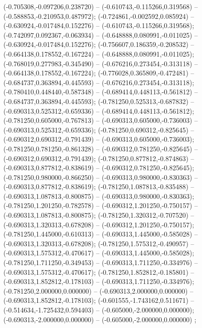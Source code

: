  (-0.705308,-0.097206,0.238720) -- (-0.610743,-0.115266,0.319568) -- (-0.588853,-0.210953,0.487972);
 (-0.724861,-0.002592,0.085924) -- (-0.630924,-0.017484,0.152276) -- (-0.610743,-0.115266,0.319568);
 (-0.742097,0.092367,-0.063934) -- (-0.648888,0.080991,-0.011025) -- (-0.630924,-0.017484,0.152276);
 (-0.756607,0.186359,-0.208532) -- (-0.664138,0.178552,-0.167224) -- (-0.648888,0.080991,-0.011025);
 (-0.768019,0.277983,-0.345490) -- (-0.676216,0.273454,-0.313118) -- (-0.664138,0.178552,-0.167224);
 (-0.776028,0.365809,-0.472481) -- (-0.684737,0.363894,-0.445593) -- (-0.676216,0.273454,-0.313118);
 (-0.780410,0.448440,-0.587348) -- (-0.689414,0.448113,-0.561812) -- (-0.684737,0.363894,-0.445593);
 (-0.781250,0.525313,-0.687832) -- (-0.690313,0.525312,-0.659336) -- (-0.689414,0.448113,-0.561812);
 (-0.781250,0.605000,-0.767813) -- (-0.690313,0.605000,-0.736003) -- (-0.690313,0.525312,-0.659336);
 (-0.781250,0.690312,-0.825645) -- (-0.690312,0.690312,-0.791439) -- (-0.690313,0.605000,-0.736003);
 (-0.781250,0.781250,-0.861328) -- (-0.690312,0.781250,-0.825645) -- (-0.690312,0.690312,-0.791439);
 (-0.781250,0.877812,-0.874863) -- (-0.690313,0.877812,-0.838619) -- (-0.690312,0.781250,-0.825645);
 (-0.781250,0.980000,-0.866250) -- (-0.690313,0.980000,-0.830363) -- (-0.690313,0.877812,-0.838619);
 (-0.781250,1.087813,-0.835488) -- (-0.690313,1.087813,-0.800875) -- (-0.690313,0.980000,-0.830363);
 (-0.781250,1.201250,-0.782578) -- (-0.690312,1.201250,-0.750157) -- (-0.690313,1.087813,-0.800875);
 (-0.781250,1.320312,-0.707520) -- (-0.690313,1.320313,-0.678208) -- (-0.690312,1.201250,-0.750157);
 (-0.781250,1.445000,-0.610313) -- (-0.690313,1.445000,-0.585028) -- (-0.690313,1.320313,-0.678208);
 (-0.781250,1.575312,-0.490957) -- (-0.690313,1.575312,-0.470617) -- (-0.690313,1.445000,-0.585028);
 (-0.781250,1.711250,-0.349453) -- (-0.690313,1.711250,-0.334976) -- (-0.690313,1.575312,-0.470617);
 (-0.781250,1.852812,-0.185801) -- (-0.690313,1.852812,-0.178103) -- (-0.690313,1.711250,-0.334976);
 (-0.781250,2.000000,0.000000) -- (-0.690313,2.000000,0.000000) -- (-0.690313,1.852812,-0.178103);
 (-0.601555,-1.743162,0.511671) -- (-0.514634,-1.725432,0.594403) -- (-0.605000,-2.000000,0.000000);
 (-0.690313,-2.000000,0.000000) -- (-0.605000,-2.000000,0.000000) ;
